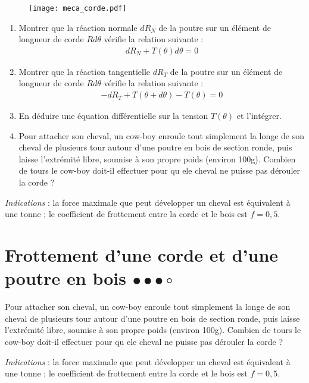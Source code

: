 \begin{figure}[h]
\centering
  \texttt{[image: meca\_corde.pdf]}
\end{figure}

\begin{enumerate}

	\item Montrer que la réaction normale $dR_N$ de la poutre sur un élément de longueur de corde $Rd\theta$ vérifie la relation suivante :
	\begin{align*}
		dR_N+T(\theta)d\theta=0
	\end{align*}
	
	\item Montrer que la réaction tangentielle $dR_T$ de la poutre sur un élément de longueur de corde $Rd\theta$ vérifie la relation suivante :
	\begin{align*}
		-dR_T+T(\theta+d\theta)-T(\theta)=0
	\end{align*}
	
	\item En déduire une équation différentielle sur la tension $T(\theta)$ et l'intégrer.
	
	\item Pour attacher son cheval, un cow-boy enroule tout simplement la longe de son cheval de plusieurs tour autour d'une poutre en bois de section ronde, puis laisse l'extrémité libre, soumise à son propre poids (environ 100g). Combien de tours le cow-boy doit-il effectuer pour qu ele cheval ne puisse pas dérouler la corde ?
	
\end{enumerate}

\textit{Indications} : la force maximale que peut développer un cheval est équivalent à une tonne ; le coefficient de frottement entre la corde et le bois est $f=0,5$.

\newpage

\section{Frottement d'une corde et d'une poutre en bois $\bullet\bullet\bullet\circ$}

Pour attacher son cheval, un cow-boy enroule tout simplement la longe de son cheval de plusieurs tour autour d'une poutre en bois de section ronde, puis laisse l'extrémité libre, soumise à son propre poids (environ 100g). Combien de tours le cow-boy doit-il effectuer pour qu ele cheval ne puisse pas dérouler la corde ?

\textit{Indications} : la force maximale que peut développer un cheval est équivalent à une tonne ; le coefficient de frottement entre la corde et le bois est $f=0,5$.
